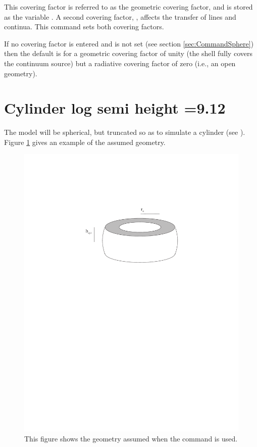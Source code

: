 This covering factor is referred to as the geometric covering factor,
and is stored as the variable .
A second covering factor,
,
affects the transfer of lines and continua.
This command sets both covering factors.

If no covering factor is entered and 
is not set (see section \ref{sec:CommandSphere}) then the default
is for a geometric covering factor of unity (the shell fully covers the
continuum source) but a radiative covering factor of zero (i.e., an open
geometry).

\section{Cylinder log semi height =9.12}

\noindent The model will be spherical,
but truncated so as to simulate a cylinder
(see \citealp{FerlandLambert1982}).
Figure \ref{fig:cylin} gives an example of the assumed geometry.

\begin{figure}
\centering
\includegraphics{cylin}
\caption[Cylindrical geometry]
{\label{fig:cylin}This figure shows the geometry assumed when the  command
is used.}
\end{figure}

